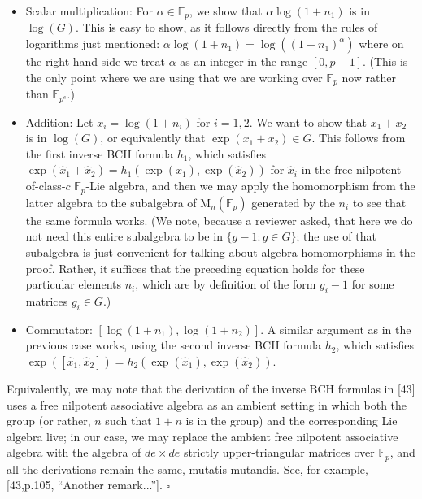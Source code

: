 \begin{itemize}
\item Scalar multiplication: For $\alpha\in\mathbb F_p$, we show that $\alpha\log(1+n_1)$ is in $\log(G)$. This is easy to show, as it follows directly from the rules of logarithms just mentioned: $\alpha\log(1+n_1)=\log((1+n_1)^\alpha)$ where on the right-hand side we treat $\alpha$ as an integer in the range $[0,p-1]$. (This is the only point where we are using that we are working over $\mathbb F_p$ now rather than $\mathbb F_{p^e}$.)
\item Addition: Let $x_i=\log(1+n_i)$ for $i=1,2$. We want to show that $x_1+x_2$ is in $\log(G)$, or equivalently that $\exp(x_1+x_2)\in G$. This follows from the first inverse BCH formula $h_1$, which satisfies $\exp(\hat x_1+\hat x_2)=h_1(\exp(\hat x_1),\exp(\hat x_2))$ for $\hat x_i$ in the free nilpotent-of-class-$c$ $\mathbb F_p$-Lie algebra, and then we may apply the homomorphism from the latter algebra to the subalgebra of $\mathrm M_n(\mathbb F_p)$ generated by the $n_i$ to see that the same formula works. (We note, because a reviewer asked, that here we do not need this entire subalgebra to be in $\{g-1:g\in G\}$; the use of that subalgebra is just convenient for talking about algebra homomorphisms in the proof. Rather, it suffices that the preceding equation holds for these particular elements $n_i$, which are by definition of the form $g_i-1$ for some matrices $g_i\in G$.)
\item Commutator: $[\log(1+n_1),\log(1+n_2)]$. A similar argument as in the previous case works, using the second inverse BCH formula $h_2$, which satisfies $\exp([\hat x_1,\hat x_2])=h_2(\exp(\hat x_1),\exp(\hat x_2))$.
\end{itemize}
Equivalently, we may note that the derivation of the inverse BCH formulas in [43] uses a free nilpotent associative algebra as an ambient setting in which both the group (or rather, $n$ such that $1+n$ is in the group) and the corresponding Lie algebra live; in our case, we may replace the ambient free nilpotent associative algebra with the algebra of $de\times de$ strictly upper-triangular matrices over $\mathbb F_p$, and all the derivations remain the same, mutatis mutandis. See, for example, [43,p.105, ``Another remark...'']. \hfill$\square$
